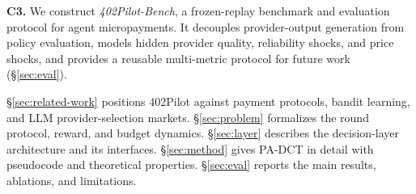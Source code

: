 \textbf{C3.} We construct \emph{402Pilot-Bench}, a frozen-replay benchmark and evaluation protocol for agent micropayments. It decouples provider-output generation from policy evaluation, models hidden provider quality, reliability shocks, and price shocks, and provides a reusable multi-metric protocol for future work (\S\ref{sec:eval}).

\S\ref{sec:related-work} positions 402Pilot against payment protocols, bandit learning, and LLM provider-selection markets. \S\ref{sec:problem} formalizes the round protocol, reward, and budget dynamics. \S\ref{sec:layer} describes the decision-layer architecture and its interfaces. \S\ref{sec:method} gives PA-DCT in detail with pseudocode and theoretical properties. \S\ref{sec:eval} reports the main results, ablations, and limitations.
